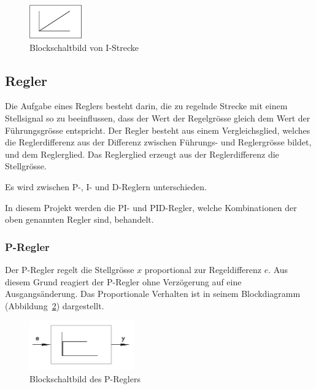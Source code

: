 \begin{figure}[h!, width=\pagewidth]
    \centering
    \includegraphics[width=0.2\textwidth]{images/IStrecke}
    \caption{Blockschaltbild von I-Strecke}
    \label{fig:IStrecke}
\end{figure}


\subsection{Regler}

Die Aufgabe  eines Reglers besteht  darin, die  zu regelnde Strecke  mit einem
Stellsignal  so  zu  beeinflussen,  dass der  Wert  der  Regelgr\"osse  gleich
dem  Wert  der F\"uhrungsgr\"osse  entspricht. Der  Regler  besteht aus  einem
Vergleichsglied,  welches  die  Reglerdifferenz  aus  der  Differenz  zwischen
F\"uhrungs- und  Reglergr\"osse bildet,  und dem  Reglerglied. Das Reglerglied
erzeugt aus der Reglerdifferenz die Stellgr\"osse.

Es wird zwischen P-, I- und D-Reglern unterschieden.

In diesem Projekt werden die PI- und PID-Regler, welche Kombinationen der oben
genannten Regler sind, behandelt.

\subsubsection*{P-Regler}
Der  P-Regler regelt  die  Stellgr\"osse $x$  proportional zur  Regeldifferenz
$e$. Aus  diesem  Grund reagiert  der  P-Regler  ohne Verz\"ogerung  auf  eine
Ausgangs\"anderung. Das  Proportionale Verhalten  ist in  seinem Blockdiagramm
(Abbildung~\ref{fig:PRegler}) dargestellt.

\begin{figure}[h!, width=\pagewidth]
    \centering
    \includegraphics[width=0.4\textwidth]{images/PRegler}
    \caption{Blockschaltbild des P-Reglers}
    \label{fig:PRegler}
\end{figure}

